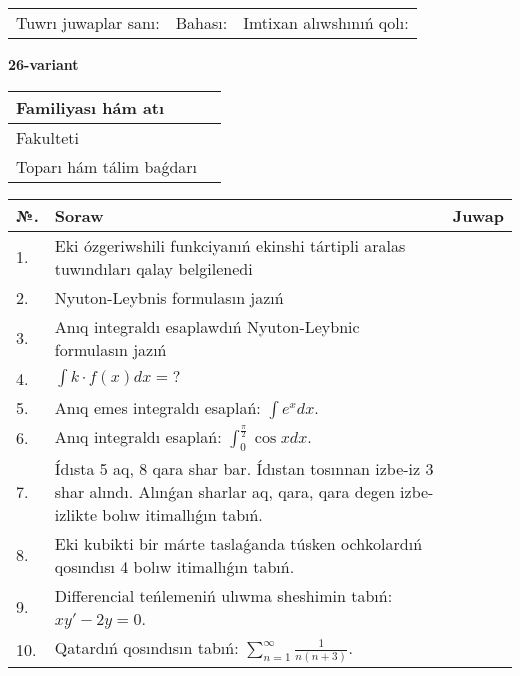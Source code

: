 \documentclass{article}
\begin{document}
\vspace{1cm}

\begin{tabular}{ c c c }
Tuwrı juwaplar sanı: \underline{\hspace{2cm}} & Bahası: \underline{\hspace{2cm}} & Imtixan alıwshınıń qolı: \underline{\hspace{2cm}} \\
\end{tabular}

\newpage

\begin{center}\textbf{26-variant}\end{center}

\bgroup
\def\arraystretch{1.5}
\begin{tabular}{ |m{6cm}|m{10cm}| }
  \hline
  Familiyası hám atı & \\
  \hline
  Fakulteti &\\
  \hline
  Toparı hám tálim baǵdarı & \\
  \hline
\end{tabular}
\egroup

\vspace{0.5cm}

\bgroup
\def\arraystretch{2}
\begin{tabular}{ |l|m{8cm}|m{7cm}| }
  \hline
  №. & Soraw & Juwap \\
  \hline
  1. & Eki ózgeriwshili funkciyanıń ekinshi tártipli aralas tuwındıları qalay belgilenedi &  \\
  \hline
  2. & Nyuton-Leybnis formulasın jazıń &  \\
  \hline
  3. & Anıq integraldı esaplawdıń Nyuton-Leybnic formulasın jazıń &  \\
  \hline
  4. & $\displaystyle\int k \cdot f(x)dx = ?$ &  \\
  \hline
  5. & Anıq emes integraldı esaplań: $\displaystyle\int e^{x}dx$. &  \\
  \hline
  6. & Anıq integraldı esaplań: $\displaystyle\int_{0}^{\frac{\pi}{2}}\cos xdx$. &  \\
  \hline
  7. & Ídısta 5 aq, 8 qara shar bar. Ídıstan tosınnan izbe-iz 3 shar alındı. Alınǵan sharlar aq, qara, qara degen izbe-izlikte bolıw itimallıǵın tabıń. &  \\
  \hline
  8. & Eki kubikti bir márte taslaǵanda túsken ochkolardıń qosındısı 4 bolıw itimallıǵın tabıń. &  \\
  \hline
  9. & Differencial teńlemeniń ulıwma sheshimin tabıń: $xy' - 2y = 0$. &  \\
  \hline
  10. & Qatardıń qosındısın tabıń: $\displaystyle\sum_{n = 1}^{\infty}\frac{1}{n(n + 3)}$. &  \\
  \hline
\end{tabular}
\egroup
\end{document}
